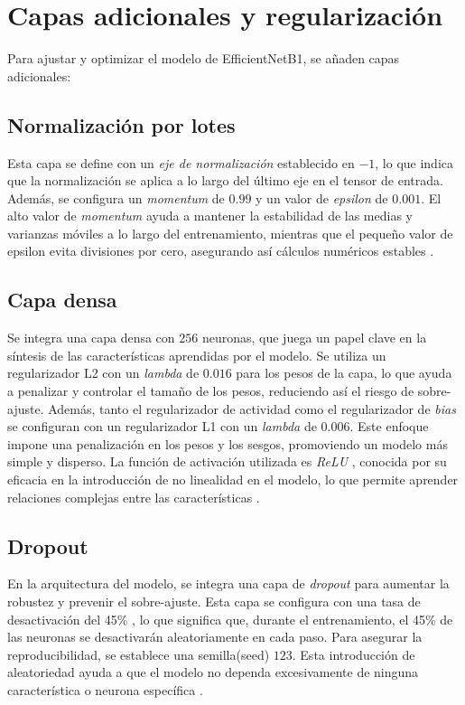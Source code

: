 \section{Capas adicionales y regularización}
   
   Para ajustar y optimizar el modelo de EfficientNetB1, se añaden capas adicionales:
   
   \subsection{Normalización por lotes}
   
   Esta capa se define con un \textit{eje de normalización} establecido en $-1$, lo que indica que la normalización se aplica a lo largo del último eje en el tensor de entrada. Además, se configura un \textit{momentum} de $0.99$ y un valor de \textit{epsilon} de $0.001$. El alto valor de \textit{momentum} ayuda a mantener la estabilidad de las medias y varianzas móviles a lo largo del entrenamiento, mientras que el pequeño valor de epsilon evita divisiones por cero, asegurando así cálculos numéricos estables .
   
   \subsection{Capa densa}
   
   Se integra una capa densa con $256$ neuronas, que juega un papel clave en la síntesis de las características aprendidas por el modelo. Se utiliza un regularizador L2 con un \textit{lambda} de $0.016$ para los pesos de la capa, lo que ayuda a penalizar y controlar el tamaño de los pesos, reduciendo así el riesgo de sobre-ajuste. Además, tanto el regularizador de actividad como el regularizador de \textit{bias} se configuran con un regularizador L1 con un \textit{lambda} de $0.006$. Este enfoque impone una penalización en los pesos y los sesgos, promoviendo un modelo más simple y disperso. La función de activación utilizada es \textit{ReLU} , conocida por su eficacia en la introducción de no linealidad en el modelo, lo que permite aprender relaciones complejas entre las características .
   
   \subsection{Dropout}
   
   En la arquitectura del modelo, se integra una capa de \textit{dropout} para aumentar la robustez y prevenir el sobre-ajuste. Esta capa se configura con una tasa de desactivación del 45\% , lo que significa que, durante el entrenamiento, el 45\% de las neuronas se desactivarán aleatoriamente en cada paso. Para asegurar la reproducibilidad, se establece una semilla(seed) $123$. Esta introducción de aleatoriedad ayuda a que el modelo no dependa excesivamente de ninguna característica o neurona específica .
   
